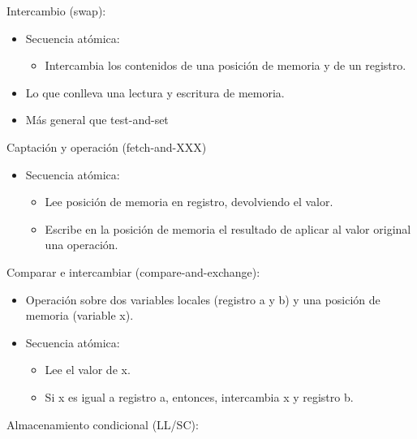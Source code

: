 \documentclass[12pt, twoside, openright]{report} %
\begin{document}
Intercambio (swap):

\begin{itemize}

	\item Secuencia atómica:

	      \begin{itemize}

		      \item Intercambia los contenidos de una posición de memoria y de un
		            registro.
	      \end{itemize}
	\item Lo que conlleva una lectura y escritura de memoria.
	\item Más general que test-and-set
\end{itemize}

Captación y operación (fetch-and-XXX)

\begin{itemize}

	\item Secuencia atómica:

	      \begin{itemize}

		      \item Lee posición de memoria en registro, devolviendo el valor.
		      \item Escribe en la posición de memoria el resultado de aplicar al
		            valor original una operación.
	      \end{itemize}
\end{itemize}

Comparar e intercambiar (compare-and-exchange):

\begin{itemize}

	\item Operación sobre dos variables locales (registro a y b) y una
	      posición de memoria (variable x).
	\item Secuencia atómica:

	      \begin{itemize}

		      \item Lee el valor de x.
		      \item Si x es igual a registro a, entonces, intercambia x y registro
		            b.
	      \end{itemize}
\end{itemize}
\pagebreak
Almacenamiento condicional (LL/SC):
\end{document}
